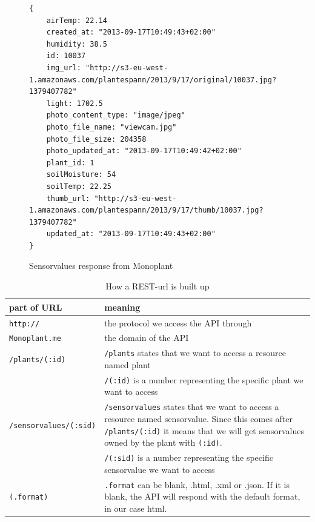\begin{figure}
	\begin{lstlisting}[style=htmlcssjs]
{
	airTemp: 22.14
	created_at: "2013-09-17T10:49:43+02:00"
	humidity: 38.5
	id: 10037
	img_url: "http://s3-eu-west-1.amazonaws.com/plantespann/2013/9/17/original/10037.jpg?1379407782"
	light: 1702.5
	photo_content_type: "image/jpeg"
	photo_file_name: "viewcam.jpg"
	photo_file_size: 204358
	photo_updated_at: "2013-09-17T10:49:42+02:00"
	plant_id: 1
	soilMoisture: 54
	soilTemp: 22.25
	thumb_url: "http://s3-eu-west-1.amazonaws.com/plantespann/2013/9/17/thumb/10037.jpg?1379407782"
	updated_at: "2013-09-17T10:49:43+02:00"
}
	\end{lstlisting}
	\caption{Sensorvalues response from Monoplant}
	\label{fig:sensorvaluesresponse}
\end{figure}



\bgroup
\def\arraystretch{1.8}	%
\begin{table}
	\centering
	\begin{tabular}{@{}lp{250pt}@{}} \toprule
		\textbf{part of URL}&	\textbf{meaning}\\ \midrule
		\texttt{http://}&	the protocol we access the API through\\ 
		\texttt{Monoplant.me}&	the domain of the API\\ 
		\texttt{/plants/(:id)}&	\texttt{/plants} states that we want to access a resource named plant \\ &
		\texttt{/(:id)} is a number representing the specific plant we want to access\\ 
		\texttt{/sensorvalues/(:sid)}&	\texttt{/sensorvalues} states that we want to access a resource named sensorvalue. Since this comes after \texttt{/plants/(:id)} it means that we will get sensorvalues owned by the plant with \texttt{(:id)}. \\ &
		\texttt{/(:sid)} is a number representing the specific sensorvalue we want to access\\ 
		\texttt{(.format)}&	 \texttt{.format} can be blank, .html, .xml or .json. If it is blank, the API will respond with the default format, in our case html. \\ \bottomrule
	\end{tabular}
	\caption{How a REST-url is built up}
	\label{fig:RESTurl}
\end{table}
\egroup

